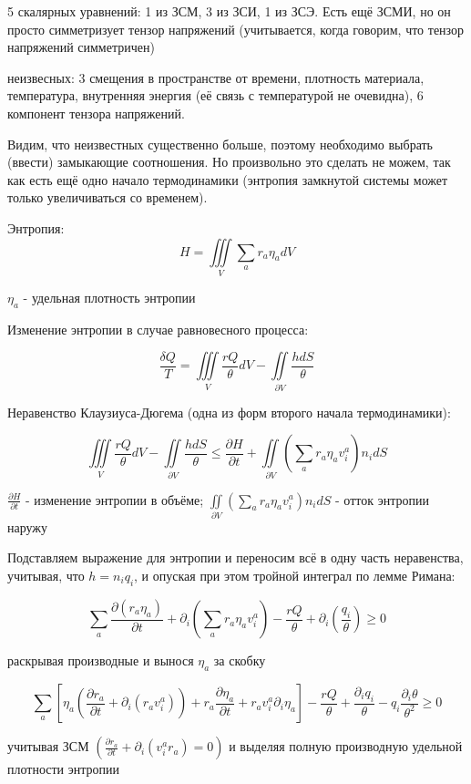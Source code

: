 \documentclass[main.tex]{subfiles}
\begin{document}
5 скалярных уравнений: 1 из ЗСМ, 3 из ЗСИ, 1 из ЗСЭ. Есть ещё ЗСМИ, но он просто симметризует тензор напряжений (учитывается, когда говорим, что тензор напряжений симметричен)

неизвесных: 3 смещения в пространстве от времени, плотность материала, температура, внутренняя энергия (её связь с температурой не очевидна), 6 компонент тензора напряжений.

Видим, что неизвестных существенно больше, поэтому необходимо выбрать (ввести) замыкающие соотношения. Но произвольно это сделать не можем, так как есть ещё одно начало термодинамики (энтропия замкнутой системы может только увеличиваться со временем).

Энтропия:
$$H=\iiint\limits_{V}{\sum\limits_{a}{r_a\eta_a}dV}$$

$\eta_a$ - удельная плотность энтропии

Изменение энтропии в случае равновесного процесса:

$$\frac{\delta Q}{T}=\iiint\limits_{V}\frac{rQ}{\theta}dV-\iint\limits_{\partial V}{\frac{hdS}{\theta}}$$

Неравенство Клаузиуса-Дюгема (одна из форм второго начала термодинамики):

$$\iiint\limits_{V}{\frac{rQ}{\theta}dV}-\iint\limits_{\partial V}\frac{hdS}{\theta}\leq\frac{\partial H}{\partial t}+\iint\limits_{\partial V}\left(\sum\limits_{a}{r_a\eta_av_i^a}\right)n_idS$$

$\displaystyle{}\frac{\partial H}{\partial t}$ - изменение энтропии в объёме; $\displaystyle{}\iint\limits_{\partial V}\left(\sum\limits_{a}{r_a\eta_av_i^a}\right)n_idS$ - отток энтропии наружу

Подставляем выражение для энтропии и переносим всё в одну часть неравенства, учитывая, что $h=n_iq_i$, и опуская при этом тройной интеграл по лемме Римана:

$$\sum\limits_{a}{\frac{\partial\left(r_a\eta_a\right)}{\partial t}}+\partial_i\left(\sum\limits_{a}{r_a\eta_av_i^a}\right)-\frac{rQ}{\theta}+\partial_i\left(\frac{q_i}{\theta}\right)\geq 0$$

раскрывая производные и вынося $\eta_a$ за скобку

$$\sum\limits_{a}{\left[\eta_a\left(\frac{\partial r_a}{\partial t}+\partial_i\left(r_av_i^a\right)\right)+r_a\frac{\partial \eta_a}{\partial t}+r_av_i^a\partial_i\eta_a\right]}-\frac{rQ}{\theta}+\frac{\partial_iq_i}{\theta}-q_i\frac{\partial_i\theta}{\theta^2}\geq 0$$

учитывая ЗСМ $\displaystyle{}\left(\frac{\partial r_{a}}{\partial t}+\partial_i\left(v_i^a r_a\right)=0\right)$ и выделяя полную производную удельной плотности энтропии 
\end{document}
